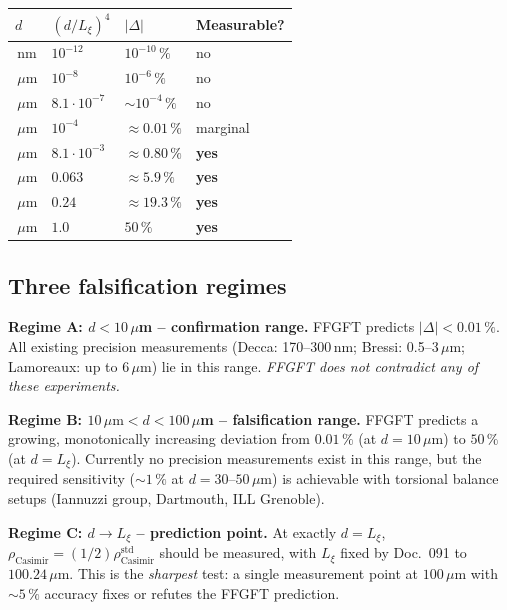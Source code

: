 \begin{center}
\renewcommand{\arraystretch}{1.3}
{\small
\begin{tabular}{>{\raggedright\arraybackslash}p{1.6cm}>{\raggedright\arraybackslash}p{1.8cm}>{\raggedright\arraybackslash}p{2.4cm}>{\raggedright\arraybackslash}p{2.4cm}}
\toprule
\textbf{$d$} & $(d/L_\xi)^4$ & \textbf{$|\Delta|$} & \textbf{Measurable?} \\
\midrule
100\,nm     & $10^{-12}$              & $10^{-10}\,\%$    & no \\
1\,$\mu$m   & $10^{-8}$               & $10^{-6}\,\%$     & no \\
3\,$\mu$m   & $8.1\!\cdot\!10^{-7}$   & $\sim 10^{-4}\,\%$ & no \\
10\,$\mu$m  & $10^{-4}$               & $\approx 0.01\,\%$ & marginal \\
30\,$\mu$m  & $8.1\!\cdot\!10^{-3}$   & $\approx 0.80\,\%$ & \textbf{yes} \\
50\,$\mu$m  & $0.063$                 & $\approx 5.9\,\%$ & \textbf{yes} \\
70\,$\mu$m  & $0.24$                  & $\approx 19.3\,\%$ & \textbf{yes} \\
100\,$\mu$m & $1.0$                   & $50\,\%$          & \textbf{yes} \\
\bottomrule
\end{tabular}
}
\renewcommand{\arraystretch}{1.0}
\end{center}

\subsection{Three falsification regimes}

\textbf{Regime A: $d < 10\,\mu$m -- confirmation range.}
FFGFT predicts $|\Delta| < 0.01\,\%$. All existing precision
measurements (Decca: 170--300\,nm; Bressi: 0.5--3\,$\mu$m;
Lamoreaux: up to 6\,$\mu$m) lie in this range. \emph{FFGFT does not
contradict any of these experiments.}

\textbf{Regime B: $10\,\mu\text{m} < d < 100\,\mu$m -- falsification range.}
FFGFT predicts a growing, monotonically increasing deviation from
$0.01\,\%$ (at $d=10\,\mu$m) to $50\,\%$ (at $d=L_\xi$). Currently no
precision measurements exist in this range, but the required
sensitivity ($\sim 1\,\%$ at $d=30$--$50\,\mu$m) is achievable with
torsional balance setups (Iannuzzi group, Dartmouth, ILL Grenoble).

\textbf{Regime C: $d \to L_\xi$ -- prediction point.}
At exactly $d = L_\xi$, $\rho_\text{Casimir} = (1/2)\rho_\text{Casimir}^\text{std}$
should be measured, with $L_\xi$ fixed by Doc.~091 to $100.24\,\mu$m.
This is the \emph{sharpest} test: a single measurement point at
$100\,\mu$m with $\sim 5\,\%$ accuracy fixes or refutes the FFGFT
prediction.

